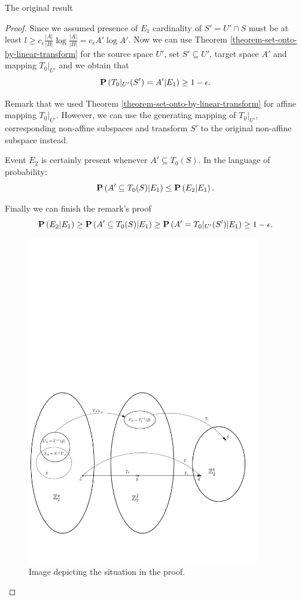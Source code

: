 \begin{section}{The original result}
\begin{proof}
Since we assumed presence of $E_1$ cardinality of $S' = U' \cap S$ must be at least $l \geq c_{\epsilon}\frac{|A|}{|B|} \log\frac{|A|}{|B|} = c_{\epsilon}{A'}\log{A'}$. Now we can use Theorem \ref{theorem-set-onto-by-linear-transform} for the source space $U'$, set $S' \subseteq U'$, target space $A'$ and mapping $T_0|_{U'}$ and we obtain that 
\[
	\mathbf{P}\left(T_0|_{U'}(S') = A' | E_1\right) \geq 1 - \epsilon \text{.}
\]

Remark that we used Theorem \ref{theorem-set-onto-by-linear-transform} for affine mapping $T_0|_{U'}$. However, we can use the generating mapping of $T_0|_{U'}$, corresponding non-affine subspaces and transform $S'$ to the original non-affine subspace instead.

Event $E_2$ is certainly present whenever $A' \subseteq T_0(S)$. In the language of probability:
\[
	\mathbf{P}\left(A' \subseteq T_0(S) | E_1\right) \leq \mathbf{P}\left(E_2 | E_1\right) \text{.}
\]

Finally we can finish the remark's proof
\[
	\mathbf{P}\left(E_2 | E_1\right) \geq \mathbf{P}\left(A' \subseteq T_0(S) | E_1\right) \geq \mathbf{P}\left(A' = T_0|_{U'}(S') | E_1\right) \geq 1 - \epsilon \text{.}
\]

\begin{figure}
  \centering
    \includegraphics[width=0.9\textwidth]{images/elpsl_proof}
  \caption{Image depicting the situation in the proof.}
\end{figure}


\end{proof}
\end{section}
